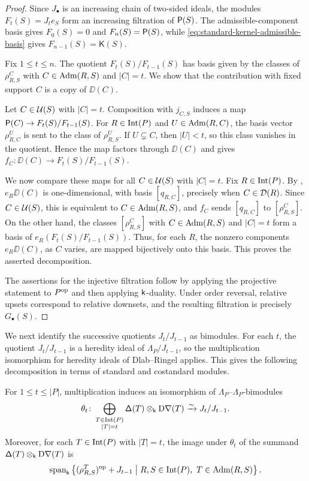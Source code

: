 \begin{proof}
Since $J_\bullet$ is an increasing chain of two-sided ideals, the
modules $F_t(S)=J_te_S$ form an increasing filtration of $\mathsf P(S)$.
The admissible-component basis gives $F_0(S)=0$ and
$F_n(S)=\mathsf P(S)$, while
\eqref{eq:standard-kernel-admissible-basis} gives
$F_{n-1}(S)=\mathsf K(S)$.

Fix $1\leq t\leq n$. The quotient $F_t(S)/F_{t-1}(S)$ has basis
given by the classes of $\rho_{R,S}^C$ with
$C\in\operatorname{Adm}(R,S)$ and $|C|=t$. 
We show that the contribution with fixed support $C$ is a copy of
$\DD(C)$.

Let $C\in\mathcal U(S)$ with $|C|=t$. Composition with $j_{C,S}$ induces
a map $\mathsf P(C)\rightarrow F_t(S)/F_{t-1}(S)$.
For $R\in\operatorname{Int}(P)$ and $U\in\operatorname{Adm}(R,C)$, the basis vector
$\rho_{R,C}^U$ is sent to the class of $\rho_{R,S}^U$.
If $U\subsetneq C$, then
$|U|<t$, so this class vanishes in the quotient. Hence the map
factors through $\DD(C)$ and gives
$f_C\colon\DD(C)\rightarrow F_t(S)/F_{t-1}(S)$.

We now compare these maps for all $C\in\mathcal U(S)$ with $|C|=t$.
Fix $R\in\operatorname{Int}(P)$. By ,
$e_R\DD(C)$ is one-dimensional, with basis $[q_{R,C}]$, precisely
when $C\in\mathcal D(R)$. Since $C\in\mathcal U(S)$, this is equivalent to
$C\in\operatorname{Adm}(R,S)$, and $f_C$ sends $[q_{R,C}]$ to
$[\rho_{R,S}^C]$.
On the other hand, the classes $[\rho_{R,S}^C]$ with
$C\in\operatorname{Adm}(R,S)$ and $|C|=t$ form a basis of
$e_R(F_t(S)/F_{t-1}(S))$. Thus, for each $R$, the nonzero
components $e_R\DD(C)$, as $C$ varies, are mapped bijectively onto
this basis. This proves the asserted decomposition.

The assertions for the injective filtration follow by applying the
projective statement to $P^{\mathrm{op}}$ and then applying $\mathsf{k}$-duality.
Under order reversal, relative upsets correspond to relative
downsets, and the resulting filtration is precisely $G_\bullet(S)$.
\end{proof}



We next identify the successive quotients $J_t/J_{t-1}$ as bimodules.
For each $t$, the quotient $J_t/J_{t-1}$ is a heredity ideal of
$\Lambda_P/J_{t-1}$, so the multiplication isomorphism for heredity
ideals of Dlab--Ringel \cite[Proposition~7]{DRconstruction89} applies.
This gives the following decomposition in terms of standard and costandard modules.


\begin{proposition}
\label{prop:cardinality-bimodule-strata}
For $1\leq t\leq |P|$, multiplication induces an isomorphism of
$\Lambda_P$--$\Lambda_P$-bimodules
\begin{equation}
\label{eq:cardinality-stratum-vector-space-decomposition}
\theta_t\colon
\bigoplus_{\substack{T\in\operatorname{Int}(P)\\ |T|=t}}
\mathsf\Delta(T)\otimes_{\mathsf{k}}\mathrm D\mathsf\nabla(T)
\xrightarrow{\sim}
J_t/J_{t-1}.
\end{equation}
Moreover, for each $T\in\operatorname{Int}(P)$ with $|T|=t$, the image under
$\theta_t$ of the summand
$\mathsf\Delta(T)\otimes_{\mathsf{k}}\mathrm D\mathsf\nabla(T)$ is
\[
\operatorname{span}_{\mathsf{k}}
\left\{
(\rho_{R,S}^{T})^{\mathrm{op}}+J_{t-1}
\;\middle|\;
R,S\in\operatorname{Int}(P),\ T\in\operatorname{Adm}(R,S)
\right\}.
\]
\end{proposition}


